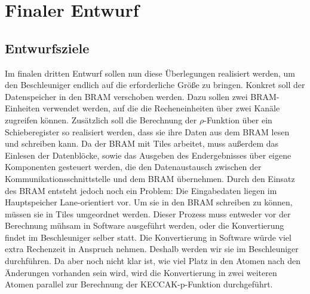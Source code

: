 \section{Finaler Entwurf}
\subsection{Entwurfsziele}
Im finalen dritten Entwurf sollen nun diese Überlegungen realisiert werden, um den Beschleuniger endlich auf die erforderliche Größe
zu bringen. Konkret soll der Datenspeicher in den BRAM verschoben werden. Dazu sollen zwei BRAM-Einheiten verwendet werden, auf die
die Recheneinheiten über zwei Kanäle zugreifen können. Zusätzlich soll die Berechnung der $\rho$-Funktion über ein Schieberegister so realisiert werden,
dass sie ihre Daten aus dem BRAM lesen und schreiben kann. Da der BRAM mit Tiles arbeitet, muss außerdem das Einlesen der Datenblöcke,
sowie das Ausgeben des Endergebnisses über eigene Komponenten gesteuert werden, die den Datenaustausch zwischen der Kommunikationsschnittstelle
und dem BRAM übernehmen. Durch den Einsatz des BRAM entsteht jedoch noch ein Problem: Die Eingabedaten liegen im Hauptspeicher Lane-orientiert vor.
Um sie in den BRAM schreiben zu können, müssen sie in Tiles umgeordnet werden. Dieser Prozess muss entweder vor der Berechnung mühsam in Software
ausgeführt werden, oder die Konvertierung findet im Beschleuniger selber statt. Die Konvertierung in Software würde viel extra Rechenzeit in Anspruch
nehmen. Deshalb werden wir sie im Beschleuniger durchführen. Da aber noch nicht klar ist, wie viel Platz in den Atomen nach den Änderungen vorhanden sein wird,
wird die Konvertierung in zwei weiteren Atomen parallel zur Berechnung der KECCAK-p-Funktion durchgeführt.

